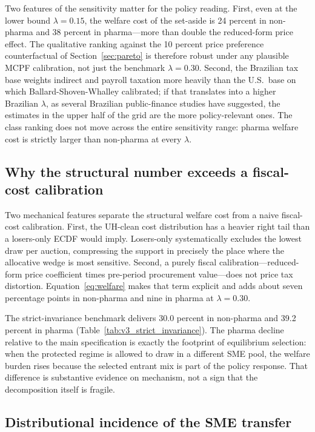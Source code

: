 Two features of the sensitivity matter for the policy reading. First, even at the lower bound $\lambda = 0.15$, the welfare cost of the set-aside is 24 percent in non-pharma and 38 percent in pharma---more than double the reduced-form price effect. The qualitative ranking against the 10 percent price preference counterfactual of Section~\ref{sec:pareto} is therefore robust under any plausible MCPF calibration, not just the benchmark $\lambda = 0.30$. Second, the Brazilian tax base weights indirect and payroll taxation more heavily than the U.S.\ base on which Ballard-Shoven-Whalley calibrated; if that translates into a higher Brazilian $\lambda$, as several Brazilian public-finance studies have suggested, the estimates in the upper half of the grid are the more policy-relevant ones. The class ranking does not move across the entire sensitivity range: pharma welfare cost is strictly larger than non-pharma at every $\lambda$.

\subsection{Why the structural number exceeds a fiscal-cost calibration}

Two mechanical features separate the structural welfare cost from a naive fiscal-cost calibration. First, the UH-clean cost distribution has a heavier right tail than a losers-only ECDF would imply. Losers-only systematically excludes the lowest draw per auction, compressing the support in precisely the place where the allocative wedge is most sensitive. Second, a purely fiscal calibration---reduced-form price coefficient times pre-period procurement value---does not price tax distortion. Equation~\eqref{eq:welfare} makes that term explicit and adds about seven percentage points in non-pharma and nine in pharma at $\lambda = 0.30$.

The strict-invariance benchmark delivers 30.0 percent in non-pharma and 39.2 percent in pharma (Table~\ref{tab:v3_strict_invariance}). The pharma decline relative to the main specification is exactly the footprint of equilibrium selection: when the protected regime is allowed to draw in a different SME pool, the welfare burden rises because the selected entrant mix is part of the policy response. That difference is substantive evidence on mechanism, not a sign that the decomposition itself is fragile.

\subsection{Distributional incidence of the SME transfer}

